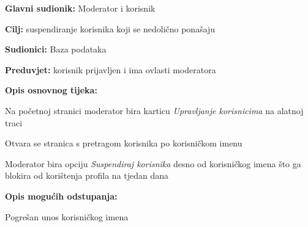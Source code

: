 					\noindent {}
					\begin{packed_item}
						
						\item \textbf{Glavni sudionik: }Moderator i korisnik
						\item  \textbf{Cilj:} suspendiranje korisnika koji se nedolično ponašaju
						\item  \textbf{Sudionici:}
						Baza podataka
						\item  \textbf{Preduvjet:} korisnik prijavljen i ima ovlasti moderatora
						\item  \textbf{Opis osnovnog tijeka:}
						
						\item[] \begin{packed_enum}
							
							\item	Na početnoj stranici moderator bira karticu \textit{Upravljanje korisnicima} na alatnoj traci
							\item	Otvara se stranica s pretragom korisnika po korisničkom imenu
							\item	Moderator bira opciju \textit{Suspendiraj korisnika} desno od korisničkog imena što ga blokira od korištenja profila na tjedan dana
							
						\end{packed_enum}
						
						\item  \textbf{Opis mogućih odstupanja:}
						
						\item[] \begin{packed_item}
							
							\item[2.a] Pogrešan unos korisničkog imena
							
						\end{packed_item}
					\end{packed_item}
					
